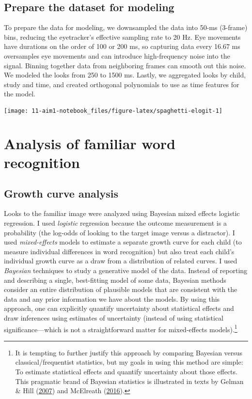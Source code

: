 \documentclass [11pt, proquest] {uwthesis}[2015/03/03]
\begin{document}
\section{Prepare the dataset for
modeling}\label{prepare-the-dataset-for-modeling}

To prepare the data for modeling, we downsampled the data into 50-ms
(3-frame) bins, reducing the eyetracker's effective sampling rate to 20
Hz. Eye movements have durations on the order of 100 or 200 ms, so
capturing data every 16.67 ms oversamples eye movements and can
introduce high-frequency noise into the signal. Binning together data
from neighboring frames can smooth out this noise. We modeled the looks
from 250 to 1500 ms. Lastly, we aggregated looks by child, study and
time, and created orthogonal polynomials to use as time features for the
model.

\texttt{[image: 11-aim1-notebook\_files/figure-latex/spaghetti-elogit-1]}

\chapter{Analysis of familiar word
recognition}\label{analysis-of-familiar-word-recognition}

\section{Growth curve analysis}\label{growth-curve-analysis}

Looks to the familiar image were analyzed using Bayesian mixed effects
logistic regression. I used \emph{logistic} regression because the
outcome measurement is a probability (the log-odds of looking to the
target image versus a distractor). I used \emph{mixed-effects} models to
estimate a separate growth curve for each child (to measure individual
differences in word recognition) but also treat each child's individual
growth curve as a draw from a distribution of related curves. I used
\emph{Bayesian} techniques to study a generative model of the data.
Instead of reporting and describing a single, best-fitting model of some
data, Bayesian methods consider an entire distribution of plausible
models that are consistent with the data and any prior information we
have about the models. By using this approach, one can explicitly
quantify uncertainty about statistical effects and draw inferences using
estimates of uncertainty (instead of using statistical
significance---which is not a straightforward matter for mixed-effects
models).\footnote{It is tempting to further justify this approach by
  comparing Bayesian versus classical/frequentist statistics, but my
  goals in using this method are simple: To estimate statistical effects
  and quantify uncertainty about those effects. This pragmatic brand of
  Bayesian statistics is illustrated in texts by Gelman \& Hill
  (\protect\hyperlink{ref-GelmanHill}{2007}) and McElreath
  (\protect\hyperlink{ref-RethinkingBook}{2016}).}
\end{document}
